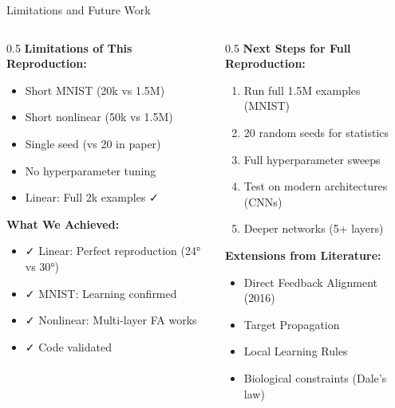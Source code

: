 \documentclass[aspectratio=169,10pt]{beamer}
\begin{document}
\begin{frame}{Limitations and Future Work}
  \begin{columns}[T]
    \begin{column}{0.5\textwidth}
      \textbf{Limitations of This Reproduction:}
      \begin{itemize}
        \item \alert{Short MNIST} (20k vs 1.5M)
        \item \alert{Short nonlinear} (50k vs 1.5M)
        \item \alert{Single seed} (vs 20 in paper)
        \item No hyperparameter tuning
        \item Linear: Full 2k examples ✓
      \end{itemize}

      \vspace{0.5cm}
      \textbf{What We Achieved:}
      \begin{itemize}
        \item ✓ Linear: Perfect reproduction (24° vs 30°)
        \item ✓ MNIST: Learning confirmed
        \item ✓ Nonlinear: Multi-layer FA works
        \item ✓ Code validated
      \end{itemize}
    \end{column}

    \begin{column}{0.5\textwidth}
      \textbf{Next Steps for Full Reproduction:}
      \begin{enumerate}
        \item Run full 1.5M examples (MNIST)
        \item 20 random seeds for statistics
        \item Full hyperparameter sweeps
        \item Test on modern architectures (CNNs)
        \item Deeper networks (5+ layers)
      \end{enumerate}

      \vspace{0.5cm}
      \textbf{Extensions from Literature:}
      \begin{itemize}
        \item Direct Feedback Alignment (2016)
        \item Target Propagation
        \item Local Learning Rules
        \item Biological constraints (Dale's law)
      \end{itemize}
    \end{column}
  \end{columns}
\end{frame}
\end{document}
